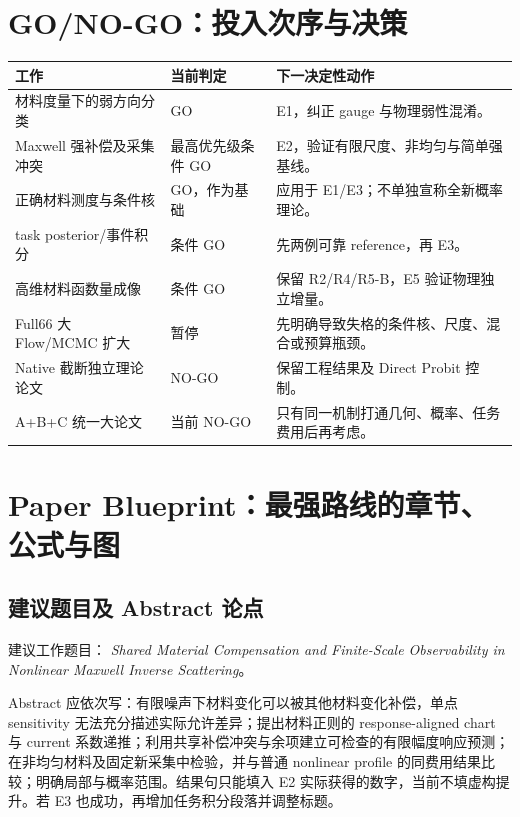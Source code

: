 \section{GO/NO-GO：投入次序与决策}
\begin{longtable}{p{.31\linewidth}p{.19\linewidth}p{.42\linewidth}}
\toprule
工作 & 当前判定 & 下一决定性动作\\
\midrule
材料度量下的弱方向分类 & GO & E1，纠正 gauge 与物理弱性混淆。\\
Maxwell 强补偿及采集冲突 & 最高优先级条件 GO & E2，验证有限尺度、非均匀与简单强基线。\\
正确材料测度与条件核 & GO，作为基础 & 应用于 E1/E3；不单独宣称全新概率理论。\\
task posterior/事件积分 & 条件 GO & 先两例可靠 reference，再 E3。\\
高维材料函数量成像 & 条件 GO & 保留 R2/R4/R5-B，E5 验证物理独立增量。\\
Full66 大 Flow/MCMC 扩大 & 暂停 & 先明确导致失格的条件核、尺度、混合或预算瓶颈。\\
Native 截断独立理论论文 & NO-GO & 保留工程结果及 Direct Probit 控制。\\
A+B+C 统一大论文 & 当前 NO-GO & 只有同一机制打通几何、概率、任务费用后再考虑。\\
\bottomrule
\end{longtable}

\section{Paper Blueprint：最强路线的章节、公式与图}
\label{sec:blueprint}
\subsection{建议题目及 Abstract 论点}
建议工作题目：
\emph{Shared Material Compensation and Finite-Scale Observability in Nonlinear Maxwell Inverse Scattering}。

Abstract 应依次写：有限噪声下材料变化可以被其他材料变化补偿，单点 sensitivity 无法充分描述实际允许差异；提出材料正则的 response-aligned chart 与 current 系数递推；利用共享补偿冲突与余项建立可检查的有限幅度响应预测；在非均匀材料及固定新采集中检验，并与普通 nonlinear profile 的同费用结果比较；明确局部与概率范围。结果句只能填入 E2 实际获得的数字，当前不填虚构提升。若 E3 也成功，再增加任务积分段落并调整标题。

